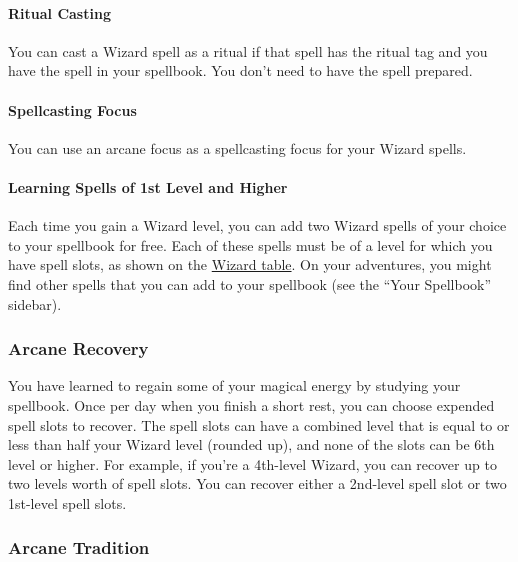 \paragraph{Ritual Casting}\label{_ritual_casting}

You can cast a Wizard spell as a ritual if that spell has the ritual tag
and you have the spell in your spellbook. You don't need to have the
spell prepared.

\paragraph{Spellcasting Focus}\label{_spellcasting_focus_2}

You can use an arcane focus as a spellcasting focus for your Wizard
spells.

\paragraph{Learning Spells of 1st Level and
Higher}\label{_learning_spells_of_1st_level_and_higher}

Each time you gain a Wizard level, you can add two Wizard spells of your
choice to your spellbook for free. Each of these spells must be of a
level for which you have spell slots, as shown on the
\hyperref[wizard-table]{Wizard table}. On your adventures, you might
find other spells that you can add to your spellbook (see the ``Your
Spellbook'' sidebar).

\subsubsection{Arcane Recovery}\label{wizard-feature-arcane-recovery}

You have learned to regain some of your magical energy by studying your
spellbook. Once per day when you finish a short rest, you can choose
expended spell slots to recover. The spell slots can have a combined
level that is equal to or less than half your Wizard level (rounded up),
and none of the slots can be 6th level or higher. For example, if you're
a 4th-level Wizard, you can recover up to two levels worth of spell
slots. You can recover either a 2nd-level spell slot or two 1st-level
spell slots.

\subsubsection{Arcane Tradition}\label{wizard-feature-arcane-tradition}

